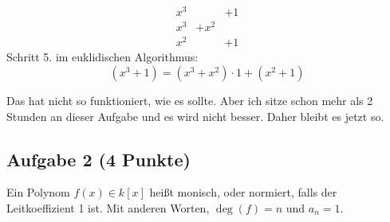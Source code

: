 \documentclass{article} %
\begin{document}
\begin{mybox}
\[
\begin{array}{ccccccccc}
  x^3 & & +1 \\
  x^3 & +  x^2 \\ \hline
  x^2 & & +1
\end{array}
\]
Schritt 5. im euklidischen Algorithmus:
\[
(x^3 +1) = (x^3 +  x^2)  \cdot 1 + (x^2 +1) 
\]

Das hat nicht so funktioniert, wie es sollte. Aber ich sitze schon mehr als 2 Stunden an dieser Aufgabe und es wird nicht besser. Daher bleibt es jetzt so. 
\end{mybox}

\subsection*{Aufgabe 2 (4 Punkte)}
Ein Polynom \( f(x) \in k[x] \) heißt monisch, oder normiert, falls der Leitkoeffizient 1 ist. Mit
anderen Worten, \( \deg(f) = n \) und \( a_n = 1 \).
\end{document}
